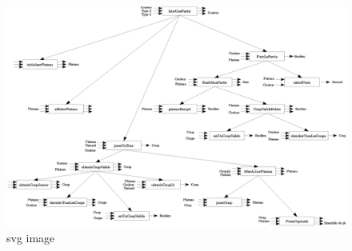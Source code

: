 \begin{figure}
  \centering
  \includegraphics[scale = 0.2]{Analyse_descendante.eps}
  \caption{svg image}
\end{figure}
